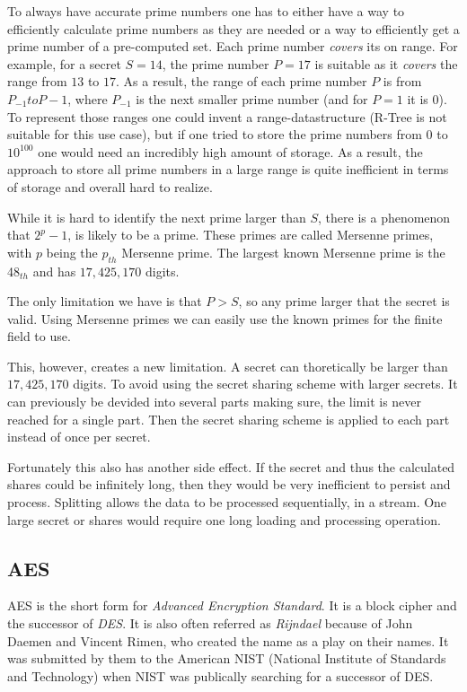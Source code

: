 To always have accurate prime numbers one has to either have a way to efficiently
calculate prime numbers as they are needed or a way to efficiently get a prime
number of a pre-computed set. Each prime number \textit{covers} its on range. For
example, for a secret $S = 14$, the prime number $P = 17$ is suitable as it
\textit{covers} the range from $13$ to $17$. As a result, the range of each
prime number $P$ is from $P_{-1} to P-1$, where $P_{-1}$ is the next smaller
prime number (and for $P = 1$ it is $0$). To represent those ranges one could
invent a range-datastructure (R-Tree is not suitable for this use case), but
if one tried to store the prime numbers from $0$ to $10^{100}$ one would need
an incredibly high amount of storage. As a result, the approach to store all
prime numbers in a large range is quite inefficient in terms of storage and
overall hard to realize.

While it is hard to identify the next prime larger than $S$, there is
a phenomenon that $2^p-1$, is likely to be a prime. These primes are called
Mersenne primes, with $p$ being the $p_{th}$ Mersenne prime. The largest known
Mersenne prime is the 48$_{th}$ and has $17,425,170$ digits.

The only limitation we have is that $P > S$, so any prime larger that the
secret is valid. Using Mersenne primes we can easily use the known primes for
the finite field to use.

This, however, creates a new limitation. A secret can thoretically be larger
than $17,425,170$ digits. To avoid using the secret sharing scheme with larger
secrets. It can previously be devided into several parts making sure, the limit
is never reached for a single part. Then the secret sharing scheme is applied to
each part instead of once per secret.

Fortunately this also has another side effect. If the secret and thus the
calculated shares could be infinitely long, then they would be very inefficient
to persist and process. Splitting allows the data to be processed sequentially,
in a stream. One large secret or shares would require one long loading and
processing operation.

\subsection{AES}

AES is the short form for \textit{Advanced Encryption Standard}. It is a block cipher
and the successor of \textit{DES}. It is also often referred as \textit{Rijndael}
because of John Daemen and Vincent Rimen, who created the name as a play on their
names. It was submitted by them to the American NIST (National Institute of
Standards and Technology) when NIST was publically searching for a successor of
DES.

